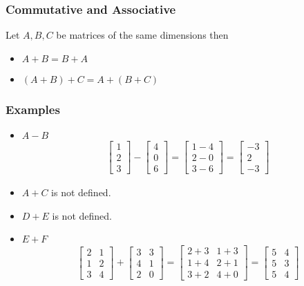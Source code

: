\documentclass[14pt]{extarticle}
\begin{document}
\subsubsection*{Commutative and Associative}
Let $A,B,C$ be matrices of the same dimensions then
\begin{itemize}
	\item $A+B = B+A$
	\item $(A+B)+C= A+(B+C)$
\end{itemize}
\subsubsection*{Examples}
\begin{itemize}
	\item $A-B$
\begin{align*}
	\begin{bmatrix}
		1 \\
		2 \\
		3
	\end{bmatrix} -
	\begin{bmatrix}
		4 \\
		0 \\
		6
	\end{bmatrix}
	= \begin{bmatrix}
		1 -4\\
		2 -0\\
		3 -6
	\end{bmatrix}
	= \begin{bmatrix}
		-3 \\
		2 \\
		-3
	\end{bmatrix}
\end{align*}
\item $A+C$ is not defined.
\item $D+E$ is not defined.
\item $E+F$
\begin{align*}
	\begin{bmatrix}
		2 & 1 \\
		1 & 2 \\
		3 & 4
	\end{bmatrix} +
	 \begin{bmatrix}
		3 & 3 \\
		4 & 1 \\
		2 & 0
	\end{bmatrix} =
	\begin{bmatrix}
		2+3 & 1+3 \\
		1+4 & 2+1 \\
		3+2 & 4+0
	\end{bmatrix} =
	\begin{bmatrix}
		5 & 4 \\
		5 & 3 \\
		5 & 4
	\end{bmatrix}
\end{align*}
\end{itemize}
\end{document}
